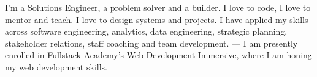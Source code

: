 
\begin{cvsummary}
  \summary
    {I'm a Solutions Engineer, a problem solver and a builder. I love to code, I love to mentor and teach. I love to design systems and projects. I have applied my skills across software engineering, analytics, data engineering, strategic planning, stakeholder relations, staff coaching and team development. --- I am presently enrolled in Fullstack Academy's Web Development Immersive, where I am honing my web development skills.  
    }
\end{cvsummary}
